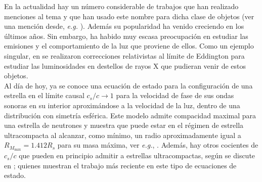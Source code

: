 \documentclass[12pt, letterpaper]{elegantbook}
\begin{document}
En la actualidad hay un número considerable de trabajos que han realizado menciones al tema y que han usado este nombre para dicha clase de objetos (ver una mención desde, \textit{e.g.} \cite{1990ApJ...362..251B}). Además su popularidad ha venido creciendo en los últimos años. Sin embargo, ha habido muy escasa preocupación en estudiar las emisiones y el comportamiento de la luz que proviene de ellos. Como un ejemplo singular, en \cite{1993ApJ...406..590N} se realizaron correcciones
relativistas al límite de Eddington para estudiar las luminosidades en destellos de rayos X que pudieran venir
de estos objetos.\\

Al día de hoy, ya se conoce una ecuación de estado para la configuración de una estrella en el límite causal $c_s/c\to 1$ para la velocidad de fase de sus ondas sonoras en su interior aproximándose a la velocidad de la luz, dentro de una distribución con simetría esférica. Este modelo admite compacidad maximal para una estrella de neutrones y muestra que puede estar en el régimen de estrella ultracompacta al alcanzar, como mínimo, un radio aproximadamente igual a $R_{M_\text{máx}}= 1.412R_s$ para su masa máxima, ver \textit{e.g.}, \cite{2012ARNPS..62..485L}. Además, hay otros cocientes de $c_s/c$ que pueden en principio admitir a estrellas ultracompactas, según se discute en \cite{PhysRevC.103.045808}; quienes muestran el trabajo más reciente en este tipo de ecuaciones de estado.\\
\end{document}
